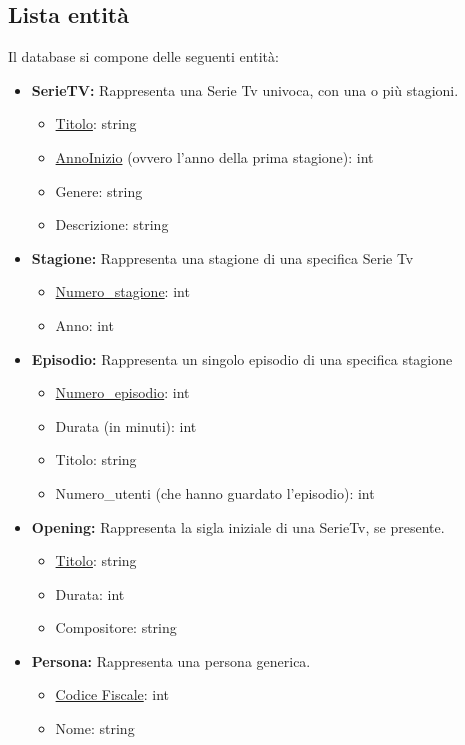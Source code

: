 \documentclass[12pt,a4paper]{article}
\begin{document}
\subsection{Lista entità}
Il database si compone delle seguenti entità:
\begin{itemize}
    \item \textbf{SerieTV:} Rappresenta una Serie Tv univoca, con una o più stagioni.
    \begin{itemize}
        \item \underline{Titolo}: string
        \item \underline{AnnoInizio} (ovvero l'anno della prima stagione): int
        \item Genere: string
        \item Descrizione: string
    \end{itemize}
    \item \textbf{Stagione:} Rappresenta una stagione di una specifica Serie Tv
    \begin{itemize}
        \item \underline{Numero\_stagione}: int
        \item Anno: int
    \end{itemize}
    \item \textbf{Episodio:} Rappresenta un singolo episodio di una specifica stagione
    \begin{itemize}
        \item \underline{Numero\_episodio}: int
        \item Durata (in minuti): int
        \item Titolo: string
        \item Numero\_utenti (che hanno guardato l'episodio): int
    \end{itemize}
    \item \textbf{Opening:} Rappresenta la sigla iniziale di una SerieTv, se presente.
    \begin{itemize}
        \item \underline{Titolo}: string
        \item Durata: int
        \item Compositore: string
    \end{itemize}
    \item \textbf{Persona:} Rappresenta una persona generica.
    \begin{itemize}
        \item \underline{Codice Fiscale}: int
        \item Nome: string

\end{itemize}
\end{itemize}
\end{document}
